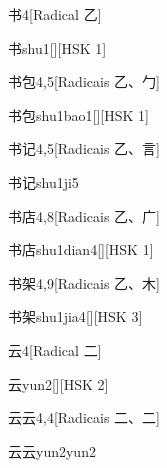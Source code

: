 \begin{entry}{书}{4}[Radical ⼄]
  \begin{phonetics}{书}{shu1}[][HSK 1]
  \end{phonetics}
\end{entry}

\begin{entry}{书包}{4,5}[Radicais ⼄、⼓]
  \begin{phonetics}{书包}{shu1bao1}[][HSK 1]
  \end{phonetics}
\end{entry}

\begin{entry}{书记}{4,5}[Radicais ⼄、⾔]
  \begin{phonetics}{书记}{shu1ji5}
  \end{phonetics}
\end{entry}

\begin{entry}{书店}{4,8}[Radicais ⼄、⼴]
  \begin{phonetics}{书店}{shu1dian4}[][HSK 1]
  \end{phonetics}
\end{entry}

\begin{entry}{书架}{4,9}[Radicais ⼄、⽊]
  \begin{phonetics}{书架}{shu1jia4}[][HSK 3]
  \end{phonetics}
\end{entry}

\begin{entry}{云}{4}[Radical ⼆]
  \begin{phonetics}{云}{yun2}[][HSK 2]
  \end{phonetics}
\end{entry}

\begin{entry}{云云}{4,4}[Radicais ⼆、⼆]
  \begin{phonetics}{云云}{yun2yun2}
  \end{phonetics}
\end{entry}


